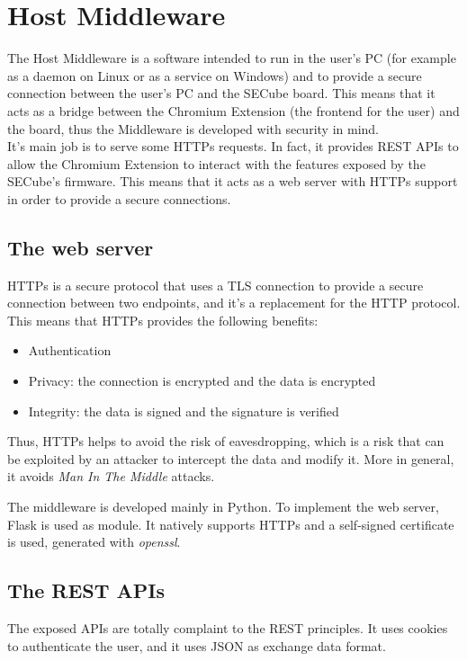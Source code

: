 \section{Host Middleware}

The Host Middleware is a software intended to run in the user's PC (for example as a daemon on Linux or as a service on Windows) and to provide a secure connection between the user's PC and the SECube board. This means that it acts as a bridge between the Chromium Extension (the frontend for the user) and the board, thus the Middleware is developed with security in mind.\\

It's main job is to serve some HTTPs requests. In fact, it provides REST APIs to allow the Chromium Extension to interact with the features exposed by the SECube's firmware. This means that it acts as a web server with HTTPs support in order to provide a secure connections.

\subsection{The web server}
HTTPs is a secure protocol that uses a TLS connection to provide a secure connection between two endpoints, and it's a replacement for the HTTP protocol. This means that HTTPs provides the following benefits:

\begin{itemize}
    \item Authentication
    \item Privacy: the connection is encrypted and the data is encrypted
    \item Integrity: the data is signed and the signature is verified
\end{itemize}

Thus, HTTPs helps to avoid the risk of eavesdropping, which is a risk that can be exploited by an attacker to intercept the data and modify it. More in general, it avoids \textit{Man In The Middle} attacks. 

The middleware is developed mainly in Python. To implement the web server, Flask is used as module. It natively supports HTTPs and a self-signed certificate is used, generated with \textit{openssl}.\\

\subsection{The REST APIs}
The exposed APIs are totally complaint to the REST principles. It uses cookies to authenticate the user, and it uses JSON as exchange data format. \\

